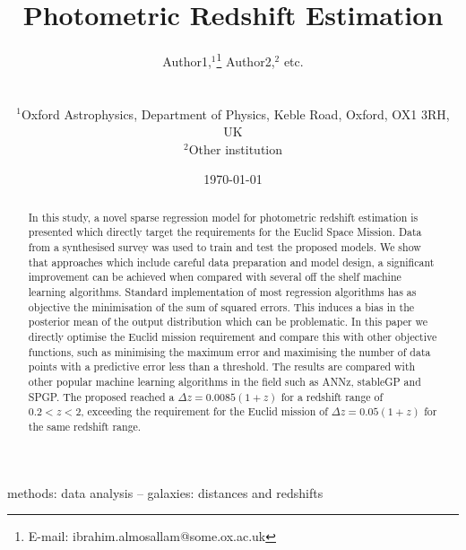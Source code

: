\documentclass[useAMS,usenatbib,fleqn]{mn2e}
\title[Photometric Redshift Estimation]{Photometric Redshift Estimation}
\author[Almosallam et al.]
{\parbox{\textwidth}{Author1,$^1$\thanks{E-mail: ibrahim.almosallam@some.ox.ac.uk} 
Author2,$^{2}$ etc.
} 
\vspace{0.4cm}\\ 
\parbox{\textwidth}{
$^1$Oxford Astrophysics, Department of Physics, Keble Road, Oxford, OX1 3RH, UK\\
$^2$Other institution \\
}}
\begin{document}
\date{\today}

\pagerange{\pageref{firstpage}--\pageref{lastpage}} 

\maketitle

\label{first page}

\begin{abstract}
In this study, a novel sparse regression model for photometric redshift estimation is presented which directly target the requirements for the Euclid Space Mission. Data from a synthesised survey was used to train and test the proposed models. We show that approaches which include careful data preparation and model design, a significant improvement can be achieved when compared with several off the shelf machine learning algorithms. Standard implementation of most regression algorithms has as objective the minimisation of the sum of squared errors. This induces a bias in the posterior mean of the output distribution which can be problematic. In this paper we directly optimise the Euclid mission requirement and compare this with other objective functions, such as minimising the maximum error and maximising the number of data points with a predictive error less than a threshold. The results are compared with other popular machine learning algorithms in the field such as ANNz, stableGP and SPGP. The proposed reached a $\Delta z = 0.0085(1+z)$ for a redshift range of $0.2 < z < 2$, exceeding the requirement for the Euclid mission of $\Delta z = 0.05(1+z)$ for the same redshift range.

\end{abstract}

\begin{keywords}
methods: data analysis -- galaxies: distances and redshifts
\end{keywords}
\end{document}
